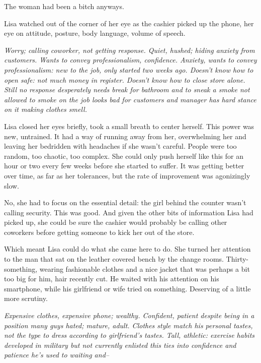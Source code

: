 The woman had been a bitch anyways.



Lisa watched out of the corner of her eye as the cashier picked up the phone, her eye on attitude, posture, body language, volume of speech.



\emph{Worry; calling coworker, not getting response. Quiet, hushed; hiding anxiety from customers.  Wants to convey professionalism, confidence. Anxiety, wants to convey professionalism: new to the job, only started two weeks ago.  Doesn't know how to open safe: not much money in register.  Doesn't know how to close store alone.  Still no response desperately needs break for bathroom and to sneak a smoke not allowed to smoke on the job looks bad for customers and manager has hard stance on it making clothes smell.}



Lisa closed her eyes briefly, took a small breath to center herself.  This power was new, untrained.  It had a way of running away from her, overwhelming her and leaving her bedridden with headaches if she wasn't careful.  People were too random, too chaotic, too complex.  She could only push herself like this for an hour or two every few weeks before she started to suffer.  It was getting better over time, as far as her tolerances, but the rate of improvement was agonizingly slow.



No, she had to focus on the essential detail: the girl behind the counter wasn't calling security.  This was good.  And given the other bits of information Lisa had picked up, she could be sure the cashier would probably be calling other coworkers before getting someone to kick her out of the store.



Which meant Lisa could do what she came here to do.  She turned her attention to the man that sat on the leather covered bench by the change rooms.  Thirty-something, wearing fashionable clothes and a nice jacket that was perhaps a bit too big for him, hair recently cut.  He waited with his attention on his smartphone, while his girlfriend or wife tried on something.  Deserving of a little more scrutiny.



\emph{Expensive clothes, expensive phone; wealthy. Confident, patient despite being in a position many guys hated; mature, adult.  Clothes style match his personal tastes, not the type to dress according to girlfriend's tastes. Tall, athletic: exercise habits developed in military but not currently enlisted this ties into confidence and patience he's used to waiting and--}



